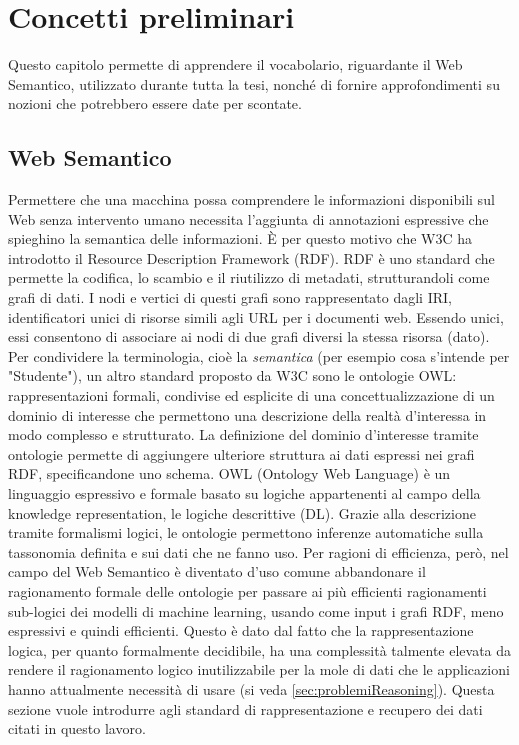 \chapter[Concetti preliminari]{Concetti preliminari}\label{chap:preliminaries}
Questo capitolo permette di apprendere il vocabolario, riguardante il Web Semantico, utilizzato durante tutta la tesi, nonché di fornire approfondimenti su nozioni che potrebbero essere date per scontate.

\section[Web Semantico]{Web Semantico}
Permettere che una macchina possa comprendere le informazioni disponibili sul Web senza intervento umano \cite{berners2001semantic} necessita l'aggiunta di annotazioni espressive che spieghino la semantica delle informazioni. È per questo motivo che W3C ha introdotto il Resource Description Framework (RDF). RDF è uno standard che permette la codifica, lo scambio e il riutilizzo di metadati, strutturandoli come grafi di dati. I nodi e vertici di questi grafi sono rappresentato dagli IRI, identificatori unici di risorse simili agli URL per i documenti web. Essendo unici, essi consentono di associare ai nodi di due grafi diversi la stessa risorsa (dato). Per condividere la terminologia, cioè la \textit{semantica} (per esempio cosa s'intende per "Studente"), un altro standard proposto da W3C sono le ontologie OWL: rappresentazioni formali, condivise ed esplicite di una concettualizzazione di un dominio di interesse \cite{goy2015ontologies} che permettono una descrizione della realtà d'interessa in modo complesso e strutturato. La definizione del dominio d'interesse tramite ontologie permette di aggiungere ulteriore struttura ai dati espressi nei grafi RDF, specificandone uno schema. OWL (Ontology Web Language) è un linguaggio espressivo e formale basato su logiche appartenenti al campo della knowledge representation, le logiche descrittive (DL). Grazie alla descrizione tramite formalismi logici, le ontologie permettono inferenze automatiche sulla tassonomia definita e sui dati che ne fanno uso. Per ragioni di efficienza, però, nel campo del Web Semantico è diventato d'uso comune abbandonare il ragionamento formale delle ontologie per passare ai più efficienti ragionamenti sub-logici dei modelli di machine learning, usando come input i grafi RDF, meno espressivi e quindi efficienti. Questo è dato dal fatto che la rappresentazione logica, per quanto formalmente decidibile, ha una complessità talmente elevata da rendere il ragionamento logico inutilizzabile per la mole di dati che le applicazioni hanno attualmente necessità di usare (si veda \autoref{sec:problemiReasoning}). Questa sezione vuole introdurre agli standard di rappresentazione e recupero dei dati citati in questo lavoro.

